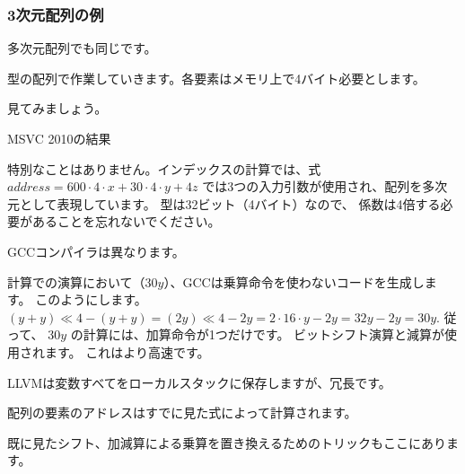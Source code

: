 ﻿\subsubsection{3次元配列の例}

多次元配列でも同じです。

\Tint 型の配列で作業していきます。各要素はメモリ上で4バイト必要とします。

見てみましょう。




MSVC 2010の結果



特別なことはありません。インデックスの計算では、式 $address=600 \cdot 4 \cdot x + 30 \cdot 4 \cdot y + 4z$ 
では3つの入力引数が使用され、配列を多次元として表現しています。
\Tint 型は32ビット（4バイト）なので、
係数は4倍する必要があることを忘れないでください。



GCCコンパイラは異なります。

計算での演算において（$30y$）、GCCは乗算命令を使わないコードを生成します。
このようにします。
$(y+y) \ll 4 - (y+y) = (2y) \ll 4 - 2y = 2 \cdot 16 \cdot y - 2y = 32y - 2y = 30y$. 
従って、 $30y$ の計算には、加算命令が1つだけです。
ビットシフト演算と減算が使用されます。
これはより高速です。




\NonOptimizing LLVMは変数すべてをローカルスタックに保存しますが、冗長です。

配列の要素のアドレスはすでに見た式によって計算されます。




既に見たシフト、加減算による乗算を置き換えるためのトリックもここにあります。

